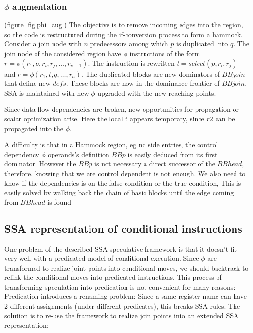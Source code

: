 \subsubsection{$\phi$ augmentation} (figure \ref{fig:phi_aug})
The objective is to remove incoming edges into the region, so the code is restructured during the if-conversion process to form a hammock. Consider a join node with $n$ predecessors among which $p$ is duplicated into $q$.  The join node of the considered region have $\phi$ instructions of the form $r=\phi(r_1,p,r_i,r_j,\dots,r_{n-1})$. The instruction is rewritten $t=select(p,r_i,r_j)$ and \mbox{$r=\phi(r_1,t,q,\dots,r_n)$}. 
The duplicated blocks are new dominators of $BBjoin$ that define new $defs$. These blocks are now in the dominance frontier of $BBjoin$. SSA is maintained with new $\phi$ upgraded with the new reaching points.

Since data flow dependencies are broken, new opportunities for propagation or scalar optimization arise. Here the local $t$ appears temporary, since $r2$ can be propagated into the $\phi$.

A difficulty is that in a Hammock region, eg no side entries, the control dependency $\phi$ operands's definition $BBp$ is easily deduced from its first dominator. However the $BBp$ is not necessary a direct successor of the $BBhead$, therefore, knowing that we are control dependent is not enough. We also need to know if the dependencies is on the false condition or the true condition, This is easily solved by walking back the chain of basic blocks until the edge coming from $BBhead$ is found.

\subsection{SSA representation of conditional instructions}

One problem of the described SSA-speculative framework is that it doesn't fit very well with a predicated model of conditional execution. Since $\phi$ are transformed to realize joint points into conditional moves, we should backtrack to relink the conditional moves into predicated instructions. This process of transforming speculation into predication is not convenient for many reasons:
- Predication introduces a renaming problem: Since a same register name can have 2 different assignments (under different predicates), this breaks SSA rules. The solution is to re-use the framework to realize join points into an extended SSA representation:

